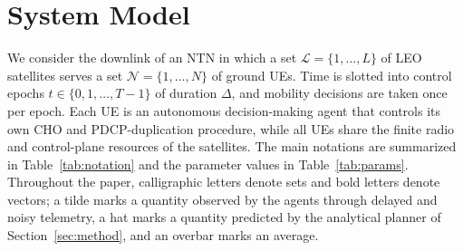 \documentclass[journal]{IEEEtran}
\newcommand{\Lset}{\mathcal{L}}
\newcommand{\Nset}{\mathcal{N}}
\begin{document}
\section{System Model}
\label{sec:system}

We consider the downlink of an NTN in which a set $\Lset=\{1,\dots,L\}$ of
LEO satellites serves a set $\Nset=\{1,\dots,N\}$ of ground UEs. Time is
slotted into control epochs $t\in\{0,1,\dots,T-1\}$ of duration $\Delta$,
and mobility decisions are taken once per epoch. Each UE is an autonomous
decision-making agent that controls its own CHO and PDCP-duplication
procedure, while all UEs share the finite radio and control-plane resources
of the satellites. The main notations are summarized in
Table~\ref{tab:notation} and the parameter values in Table~\ref{tab:params}.
Throughout the paper, calligraphic letters denote sets and bold letters
denote vectors; a tilde marks a quantity observed by the agents through
delayed and noisy telemetry, a hat marks a quantity predicted by the
analytical planner of Section~\ref{sec:method}, and an overbar marks an
average.
\end{document}

